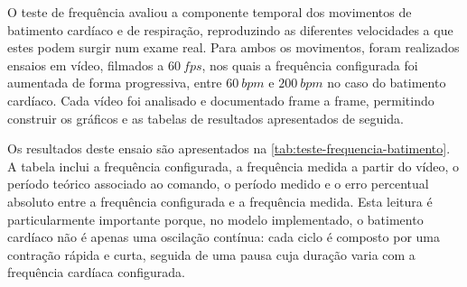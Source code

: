 O teste de frequência avaliou a componente temporal dos movimentos de batimento cardíaco e de respiração, reproduzindo as diferentes velocidades a que estes podem surgir num exame real. Para ambos os movimentos, foram realizados ensaios em vídeo, filmados a \(60~fps\), nos quais a frequência configurada foi aumentada de forma progressiva, entre \(60~bpm\) e \(200~bpm\) no caso do batimento cardíaco. Cada vídeo foi analisado e documentado frame a frame, permitindo construir os gráficos e as tabelas de resultados apresentados de seguida.

Os resultados deste ensaio são apresentados na \cref{tab:teste-frequencia-batimento}. A tabela inclui a frequência configurada, a frequência medida a partir do vídeo, o período teórico associado ao comando, o período medido e o erro percentual absoluto entre a frequência configurada e a frequência medida. Esta leitura é particularmente importante porque, no modelo implementado, o batimento cardíaco não é apenas uma oscilação contínua: cada ciclo é composto por uma contração rápida e curta, seguida de uma pausa cuja duração varia com a frequência cardíaca configurada.

